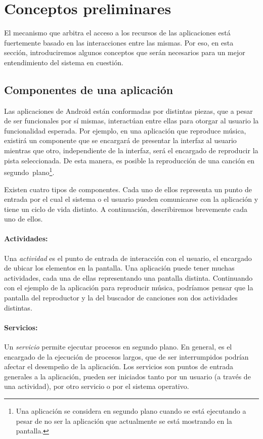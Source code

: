 \section{Conceptos preliminares}
\label{section:preliminary}
El mecanismo que arbitra el acceso a los recursos de las aplicaciones está fuertemente basado en las
interacciones entre las mismas. Por eso, en esta sección, introduciremos algunos conceptos que serán
necesarios para un mejor entendimiento del sistema en cuestión.

\subsection{Componentes de una aplicación}
Las aplicaciones de Android están conformadas por distintas piezas, que a pesar de ser funcionales por
sí mismas, interactúan entre ellas para otorgar al usuario la funcionalidad esperada. Por ejemplo, en
una aplicación que reproduce música, existirá un componente que se encargará de presentar la interfaz
al usuario mientras que otro, independiente de la interfaz, será el encargado de reproducir la pista
seleccionada. De esta manera, es posible la reproducción de una canción en segundo~plano\footnote{Una
    aplicación se considera en segundo plano cuando se está ejecutando a pesar de no ser la aplicación que
    actualmente se está mostrando en la pantalla.}.

Existen cuatro tipos de componentes. Cada uno de ellos representa un punto de entrada por el cual el
sistema o el usuario pueden comunicarse con la aplicación y tiene un ciclo de vida distinto. A
continuación, describiremos brevemente cada uno de ellos.

\paragraph{Actividades:}
Una \textit{actividad} es el punto de entrada de interacción con el usuario, el encargado de ubicar
los elementos en la pantalla. Una aplicación puede tener muchas actividades, cada una de ellas
representando una pantalla distinta. Continuando con el ejemplo de la aplicación para reproducir
música, podríamos pensar que la pantalla del reproductor y la del buscador de canciones son dos
actividades distintas.

\paragraph{Servicios:}
Un \textit{servicio} permite ejecutar procesos en segundo plano. En general, es el encargado de la
ejecución de procesos largos, que de ser interrumpidos podrían afectar el desempeño de la aplicación.
Los servicios son puntos de entrada generales a la aplicación, pueden ser iniciados tanto por un
usuario (a través de una actividad), por otro servicio o por el sistema operativo.

